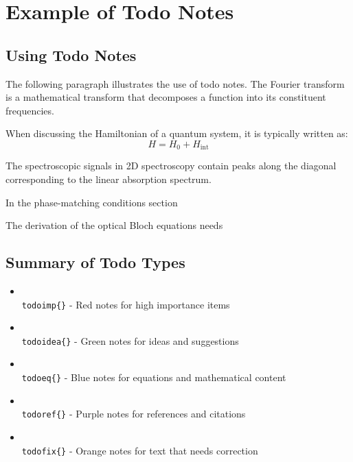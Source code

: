 \chapter{Example of Todo Notes}

\section{Using Todo Notes}

\noindent The following paragraph illustrates the use of todo notes. The Fourier transform is a mathematical transform that decomposes a function into its constituent frequencies. 

\noindent When discussing the Hamiltonian of a quantum system, it is typically written as:
\begin{equation}
	H = H_0 + H_{\mathrm{int}}
\end{equation}


\noindent The spectroscopic signals in 2D spectroscopy contain peaks along the diagonal corresponding to the linear absorption spectrum. 

\noindent In the phase-matching conditions section 

\noindent The derivation of the optical Bloch equations needs 

\section{Summary of Todo Types}

\begin{itemize}
	\item \texttt{\\todoimp\{\}} - Red notes for high importance items
	\item \texttt{\\todoidea\{\}} - Green notes for ideas and suggestions
	\item \texttt{\\todoeq\{\}} - Blue notes for equations and mathematical content
	\item \texttt{\\todoref\{\}} - Purple notes for references and citations
	\item \texttt{\\todofix\{\}} - Orange notes for text that needs correction
\end{itemize}

